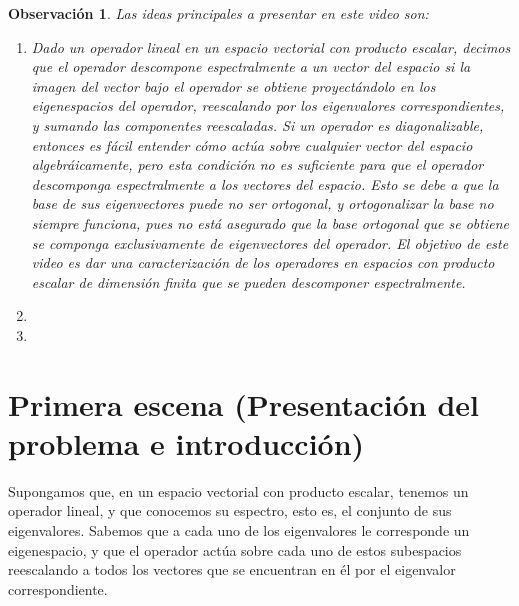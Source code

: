 \documentclass[12pt,dvipsnames]{article}
\newtheorem{obs}{Observación}[section]
\begin{document}

\begin{obs}
    Las ideas principales a presentar en este video son:

    \begin{enumerate}[label=(\roman*)]
        \item Dado un operador lineal en un espacio vectorial con producto escalar, decimos que el operador descompone espectralmente a un vector del espacio si la imagen del vector bajo el operador se obtiene proyectándolo en los eigenespacios del operador, reescalando por los eigenvalores correspondientes, y sumando las componentes reescaladas. Si un operador es diagonalizable, entonces es fácil entender cómo actúa sobre cualquier vector del espacio algebráicamente, pero esta condición no es suficiente para que el operador descomponga espectralmente a los vectores del espacio. Esto se debe a que la base de sus eigenvectores puede no ser ortogonal, y ortogonalizar la base no siempre funciona, pues no está asegurado que la base ortogonal que se obtiene se componga exclusivamente de eigenvectores del operador. El objetivo de este video es dar una caracterización de los operadores en espacios con producto escalar de dimensión finita que se pueden descomponer espectralmente.

        \item 

        \item 
    \end{enumerate}
\end{obs}


\newpage
\section{Primera escena (Presentación del problema e introducción)}

Supongamos que, en un espacio vectorial con producto escalar, tenemos un operador lineal, y que conocemos su espectro, esto es, el conjunto de sus eigenvalores. Sabemos que a cada uno de los eigenvalores le corresponde un eigenespacio, y que el operador actúa sobre cada uno de estos subespacios reescalando a todos los vectores que se encuentran en él por el eigenvalor correspondiente.
\end{document}
